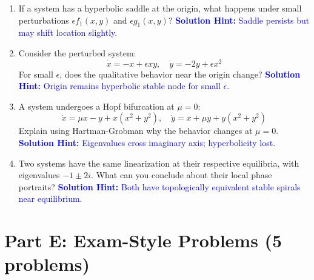 \documentclass[12pt]{article}
\newcommand{\solution}[1]{\textcolor{blue}{\textbf{Solution Hint:} #1}}
\begin{document}
\begin{enumerate}[resume]
\item If a system has a hyperbolic saddle at the origin, what happens under small perturbations $\epsilon f_1(x,y)$ and $\epsilon g_1(x,y)$?
\solution{Saddle persists but may shift location slightly.}

\item Consider the perturbed system:
$$\dot{x} = -x + \epsilon xy, \quad \dot{y} = -2y + \epsilon x^2$$
For small $\epsilon$, does the qualitative behavior near the origin change?
\solution{Origin remains hyperbolic stable node for small $\epsilon$.}

\item A system undergoes a Hopf bifurcation at $\mu = 0$:
$$\dot{x} = \mu x - y + x(x^2 + y^2), \quad \dot{y} = x + \mu y + y(x^2 + y^2)$$
Explain using Hartman-Grobman why the behavior changes at $\mu = 0$.
\solution{Eigenvalues cross imaginary axis; hyperbolicity lost.}

\item Two systems have the same linearization at their respective equilibria, with eigenvalues $-1 \pm 2i$. What can you conclude about their local phase portraits?
\solution{Both have topologically equivalent stable spirals near equilibrium.}
\end{enumerate}

\section*{Part E: Exam-Style Problems (5 problems)}
\end{document}

